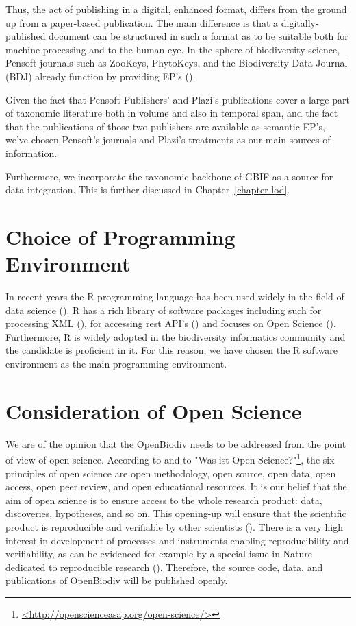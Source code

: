 Thus, the act of publishing in a digital, enhanced format, differs from the ground up from a paper-based publication. The main difference is that a digitally-published document can be structured in such a format as to be suitable both for machine processing and to the human eye. In the sphere of biodiversity science, Pensoft journals such as ZooKeys, PhytoKeys, and the Biodiversity Data Journal (BDJ) already function by providing EP's (\cite{penev_semantic_2010}).

Given the fact that Pensoft Publishers' and Plazi's publications cover a large part of taxonomic literature both in volume and also in temporal span, and the fact that the publications of those two publishers are available as semantic EP's, we've chosen Pensoft's journals and Plazi's treatments as our main sources of information.

Furthermore, we incorporate the taxonomic backbone of GBIF \cite{gbif_secretariat_gbif_2017} as a source for data integration. This is further discussed in Chapter~\ref{chapter-lod}.

\section{Choice of Programming Environment}

In recent years the R programming language has been used widely in the field of data science (\cite{r_core_team_r:_2016}). R has a rich library of software packages including such for processing XML (\cite{wickham_xml2:_2018}), for accessing rest API's (\cite{wickham_httr:_2017}) and focuses on Open Science (). Furthermore, R is widely adopted in the biodiversity informatics community and the candidate is proficient in it. For this reason, we have chosen the R software environment as the main programming environment.

\section{Consideration of Open Science}

We are of the opinion that the OpenBiodiv needs to be addressed from the point of view of open science. According to \cite{kraker_case_2011} and to "Was ist Open Science?"\footnote{\href{http://openscienceasap.org/open-science/>}{<http://openscienceasap.org/open-science/>}}, the six principles of open science are open methodology, open source, open data, open access, open peer review, and open educational resources. It is our belief that the aim of open science is to ensure access to the whole research product: data, discoveries, hypotheses, and so on. This opening-up will ensure that the scientific product is reproducible and verifiable by other scientists (\cite{mietchen_transformative_2014}). There is a very high interest in development of processes and instruments enabling reproducibility and verifiability, as can be evidenced for example by a special issue in Nature dedicated to reproducible research (\cite{noauthor_challenges_2010}). Therefore, the source code, data, and publications of OpenBiodiv will be published openly.

